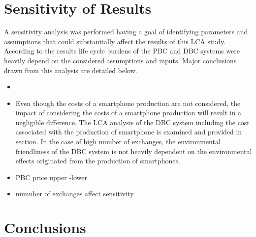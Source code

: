 \documentclass[conference]{IEEEtran}
\begin{document}
\section{Sensitivity of Results}

A sensitivity analysis was performed having a goal of identifying parameters and assumptions that could substantially affect the results of this LCA study. According to the results life cycle burdens of the PBC and DBC systems were heavily depend on the considered assumptions and inputs. Major conclusions drawn from this analysis are detailed below.

\begin{itemize}
\item 
\item Even though the costs of a smartphone production are not considered, the impact of considering the costs of a smartphone production will result in a negligible difference. The LCA analysis of the DBC system including the cost associated with the production of smartphone is examined and provided in section. In the case of high number of exchanges, the environmental friendliness of the DBC system is not heavily dependent on the environmental effects originated from the production of smartphones.

\item PBC price upper -lower
\item numnber of exchanges affect sensitivity

\end{itemize}

\section{Conclusions}
\end{document}
